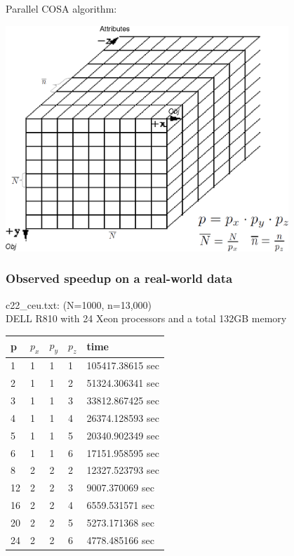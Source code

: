 \documentclass{beamer}
\begin{document}
\begin{frame}
Parallel COSA algorithm:
\begin{center} 
  \includegraphics[width=0.8\textwidth]{figures/3d_data.eps} 
\end{center}
\end{frame}



\begin{frame}
\frametitle{Observed speedup on a real-world data}
c22\_ceu.txt: (N=1000, n=13,000) \\
DELL R810 with 24 Xeon processors and a total 132GB memory
\begin{center}
    \begin{tabular}{ | l | l | l | l | l |}
    \hline
      p   & $p_x$ & $p_y$   &  $p_z$  & time\\ \hline
      1   & 1     & 1          & 1      & 105417.38615 sec\\ \hline
      2   & 1     & 1          & 2      & 51324.306341 sec\\ \hline
      3   & 1     & 1          & 3      & 33812.867425 sec\\ \hline
      4   & 1     & 1          & 4      & 26374.128593 sec\\ \hline
      5   & 1     & 1          & 5      & 20340.902349 sec\\ \hline
      6   & 1     & 1          & 6      & 17151.958595 sec\\ \hline
      8   & 2     & 2          & 2      & 12327.523793 sec\\ \hline
      12  & 2     & 2          & 3      & 9007.370069  sec\\ \hline
      16  & 2     & 2          & 4      & 6559.531571  sec\\ \hline
      20  & 2     & 2          & 5      & 5273.171368  sec\\ \hline
      24  & 2     & 2          & 6      & 4778.485166  sec\\ \hline
    \end{tabular}
\end{center}
\end{frame}
\end{document}
